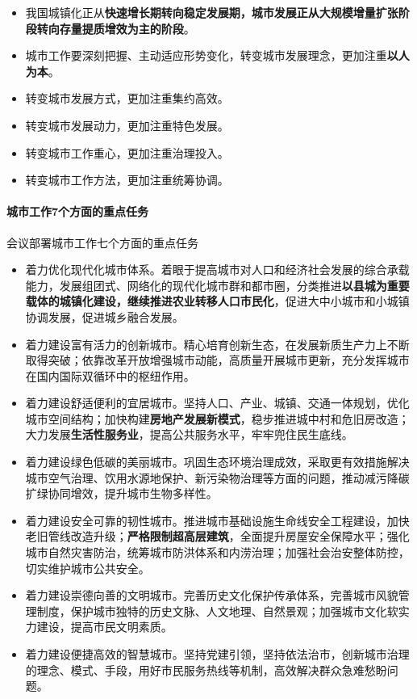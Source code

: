 \begin{itemize}
    \item 我国城镇化正从\textbf{快速增长期转向稳定发展期，城市发展正从大规模增量扩张阶段转向存量提质增效为主的阶段}。
    \item 城市工作要深刻把握、主动适应形势变化，转变城市发展理念，更加注重\textbf{以人为本}。
    \item 转变城市发展方式，更加注重集约高效。
    \item 转变城市发展动力，更加注重特色发展。
    \item 转变城市工作重心，更加注重治理投入。
    \item 转变城市工作方法，更加注重统筹协调。
\end{itemize}

\paragraph{城市工作7个方面的重点任务} 会议部署城市工作七个方面的重点任务

\begin{itemize}
    \item 着力优化现代化城市体系。着眼于提高城市对人口和经济社会发展的综合承载能力，发展组团式、网络化的现代化城市群和都市圈，分类推进\textbf{以县城为重要载体的城镇化建设，继续推进农业转移人口市民化}，促进大中小城市和小城镇协调发展，促进城乡融合发展。
    \item 着力建设富有活力的创新城市。精心培育创新生态，在发展新质生产力上不断取得突破；依靠改革开放增强城市动能，高质量开展城市更新，充分发挥城市在国内国际双循环中的枢纽作用。
    \item 着力建设舒适便利的宜居城市。坚持人口、产业、城镇、交通一体规划，优化城市空间结构；加快构建\textbf{房地产发展新模式}，稳步推进城中村和危旧房改造；大力发展\textbf{生活性服务业}，提高公共服务水平，牢牢兜住民生底线。
    \item 着力建设绿色低碳的美丽城市。巩固生态环境治理成效，采取更有效措施解决城市空气治理、饮用水源地保护、新污染物治理等方面的问题，推动减污降碳扩绿协同增效，提升城市生物多样性。
    \item 着力建设安全可靠的韧性城市。推进城市基础设施生命线安全工程建设，加快老旧管线改造升级；\textbf{严格限制超高层建筑}，全面提升房屋安全保障水平；强化城市自然灾害防治，统筹城市防洪体系和内涝治理；加强社会治安整体防控，切实维护城市公共安全。
    \item 着力建设崇德向善的文明城市。完善历史文化保护传承体系，完善城市风貌管理制度，保护城市独特的历史文脉、人文地理、自然景观；加强城市文化软实力建设，提高市民文明素质。
    \item 着力建设便捷高效的智慧城市。坚持党建引领，坚持依法治市，创新城市治理的理念、模式、手段，用好市民服务热线等机制，高效解决群众急难愁盼问题。
\end{itemize}

